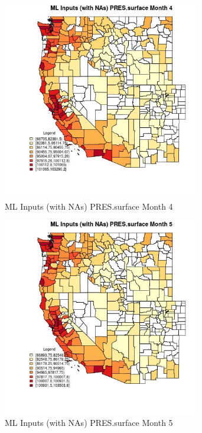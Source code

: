 \begin{figure} 
\centering  
\includegraphics[width=0.77\textwidth]{Code_Outputs/Report_ML_input_PM25_Step4_part_f_de_duplicated_aves_prioritize_24hr_obswNAs_CountyPRESsurfacemedianMonth4.jpg} 
\caption{\label{fig:Report_ML_input_PM25_Step4_part_f_de_duplicated_aves_prioritize_24hr_obswNAsCountyPRESsurfacemedianMonth4}ML Inputs (with NAs) PRES.surface Month 4} 
\end{figure} 
 

\begin{figure} 
\centering  
\includegraphics[width=0.77\textwidth]{Code_Outputs/Report_ML_input_PM25_Step4_part_f_de_duplicated_aves_prioritize_24hr_obswNAs_CountyPRESsurfacemedianMonth5.jpg} 
\caption{\label{fig:Report_ML_input_PM25_Step4_part_f_de_duplicated_aves_prioritize_24hr_obswNAsCountyPRESsurfacemedianMonth5}ML Inputs (with NAs) PRES.surface Month 5} 
\end{figure} 
 

